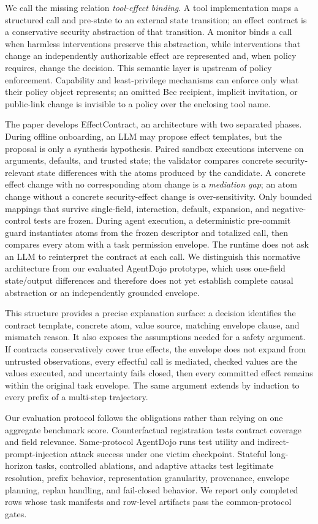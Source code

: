 \documentclass[letterpaper,twocolumn,10pt]{article}
\newcommand{\sys}{EffectContract}
\begin{document}
We call the missing relation \emph{tool-effect binding}. A tool implementation maps a structured call and pre-state to an external state transition; an effect contract is a conservative security abstraction of that transition. A monitor binds a call when harmless interventions preserve this abstraction, while interventions that change an independently authorizable effect are represented and, when policy requires, change the decision. This semantic layer is upstream of policy enforcement. Capability and least-privilege mechanisms can enforce only what their policy object represents; an omitted Bcc recipient, implicit invitation, or public-link change is invisible to a policy over the enclosing tool name.

The paper develops \sys{}, an architecture with two separated phases. During offline onboarding, an LLM may propose effect templates, but the proposal is only a synthesis hypothesis. Paired sandbox executions intervene on arguments, defaults, and trusted state; the validator compares concrete security-relevant state differences with the atoms produced by the candidate. A concrete effect change with no corresponding atom change is a \emph{mediation gap}; an atom change without a concrete security-effect change is over-sensitivity. Only bounded mappings that survive single-field, interaction, default, expansion, and negative-control tests are frozen. During agent execution, a deterministic pre-commit guard instantiates atoms from the frozen descriptor and totalized call, then compares every atom with a task permission envelope. The runtime does not ask an LLM to reinterpret the contract at each call. We distinguish this normative architecture from our evaluated AgentDojo prototype, which uses one-field state/output differences and therefore does not yet establish complete causal abstraction or an independently grounded envelope.

This structure provides a precise explanation surface: a decision identifies the contract template, concrete atom, value source, matching envelope clause, and mismatch reason. It also exposes the assumptions needed for a safety argument. If contracts conservatively cover true effects, the envelope does not expand from untrusted observations, every effectful call is mediated, checked values are the values executed, and uncertainty fails closed, then every committed effect remains within the original task envelope. The same argument extends by induction to every prefix of a multi-step trajectory.

Our evaluation protocol follows the obligations rather than relying on one aggregate benchmark score. Counterfactual registration tests contract coverage and field relevance. Same-protocol AgentDojo runs test utility and indirect-prompt-injection attack success under one victim checkpoint. Stateful long-horizon tasks, controlled ablations, and adaptive attacks test legitimate resolution, prefix behavior, representation granularity, provenance, envelope planning, replan handling, and fail-closed behavior. We report only completed rows whose task manifests and row-level artifacts pass the common-protocol gates.
\end{document}

